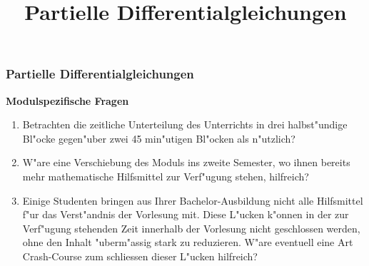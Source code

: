 \documentclass{beamer}
\title[PDGL]{Partielle Differentialgleichungen}
\begin{document}
\begin{frame}
\frametitle{Partielle Differentialgleichungen}

{\bf Modulspezifische Fragen}
\medskip

\begin{enumerate}
\item
Betrachten die zeitliche Unterteilung des Unterrichts in
drei halbst"undige Bl"ocke gegen"uber zwei 45 min"utigen
Bl"ocken als n"utzlich?
\item
W"are eine Verschiebung des Moduls ins zweite Semester,
wo ihnen bereits mehr mathematische Hilfsmittel zur Verf"ugung
stehen, hilfreich?
\item
Einige Studenten bringen aus Ihrer Bachelor-Ausbildung nicht alle
Hilfsmittel f"ur das Verst"andnis der Vorlesung mit.
Diese L"ucken k"onnen in der zur Verf"ugung stehenden Zeit
innerhalb der Vorlesung nicht geschlossen werden, ohne den
Inhalt "uberm"assig stark zu reduzieren. W"are eventuell eine
Art Crash-Course zum schliessen dieser L"ucken hilfreich?
\end{enumerate}

\end{frame}
\end{document}
